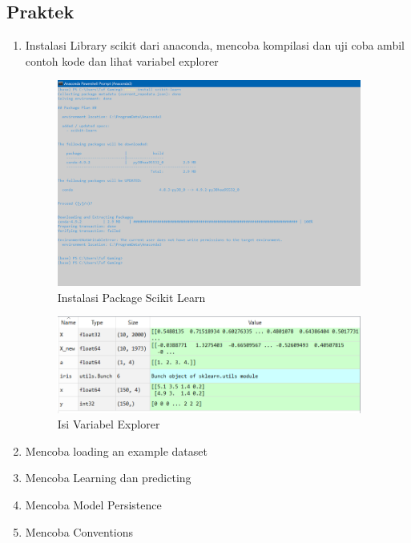 \subsection{Praktek}
\begin{enumerate}
	\item Instalasi Library scikit dari anaconda, mencoba kompilasi dan uji coba ambil contoh kode dan lihat variabel explorer
	\hfill\break
	\begin{figure}[H]
		\includegraphics[width=10cm]{figures/1184053/chapter1/1.PNG}
		\centering
		\caption{Instalasi Package Scikit Learn}
	\end{figure}
	\begin{figure}[H]
		\includegraphics[width=10cm]{figures/1184053/chapter1/2.PNG}
		\centering
		\caption{Isi Variabel Explorer}
	\end{figure}
	\item Mencoba loading an example dataset
	\hfill\break
	
	\item Mencoba Learning dan predicting
	\hfill\break
	
	\item Mencoba Model Persistence
	\hfill\break
	
	\item Mencoba Conventions
	\hfill\break
	
\end{enumerate}
